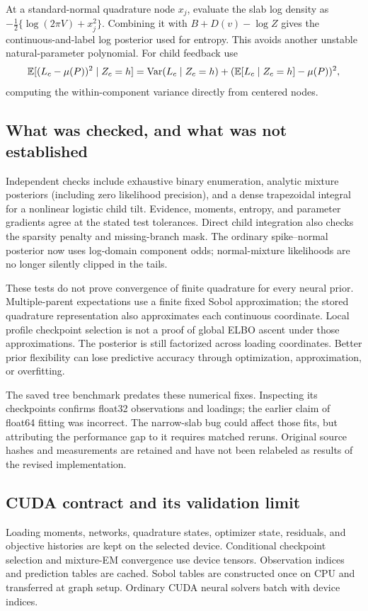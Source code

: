 At a standard-normal quadrature node \(x_j\), evaluate the slab log density
as \(-\tfrac12\{\log(2\pi V)+x_j^2\}\). Combining it with \(B+D(v)-\log Z\)
gives the continuous-and-label log posterior used for entropy. This avoids
another unstable natural-parameter polynomial. For child feedback use
\[
\mathbb E[(L_c-\mu(P))^2\mid Z_c=h]
=\operatorname{Var}(L_c\mid Z_c=h)
 +(\mathbb E[L_c\mid Z_c=h]-\mu(P))^2,
\]
computing the within-component variance directly from centered nodes.

\subsection{What was checked, and what was not established}
Independent checks include exhaustive binary enumeration, analytic mixture
posteriors (including zero likelihood precision), and a dense trapezoidal
integral for a nonlinear logistic child tilt. Evidence, moments, entropy,
and parameter gradients agree at the stated test tolerances. Direct child
integration also checks the sparsity penalty and missing-branch mask.
The ordinary spike--normal posterior now uses log-domain component odds;
normal-mixture likelihoods are no longer silently clipped in the tails.

These tests do not prove convergence of finite quadrature for every neural
prior. Multiple-parent expectations use a finite fixed Sobol approximation;
the stored quadrature representation also approximates each continuous
coordinate. Local profile checkpoint selection is not a proof of global
ELBO ascent under those approximations. The posterior is still factorized
across loading coordinates. Better prior flexibility can lose predictive
accuracy through optimization, approximation, or overfitting.

The saved tree benchmark predates these numerical fixes. Inspecting its
checkpoints confirms float32 observations and loadings; the earlier claim
of float64 fitting was incorrect. The narrow-slab bug could affect those
fits, but attributing the performance gap to it requires matched reruns.
Original source hashes and measurements are retained and have not been
relabeled as results of the revised implementation.

\subsection{CUDA contract and its validation limit}
Loading moments, networks, quadrature states, optimizer state, residuals,
and objective histories are kept on the selected device. Conditional
checkpoint selection and mixture-EM convergence use device tensors.
Observation indices and prediction tables are cached. Sobol tables are
constructed once on CPU and transferred at graph setup. Ordinary CUDA
neural solvers batch with device indices.


